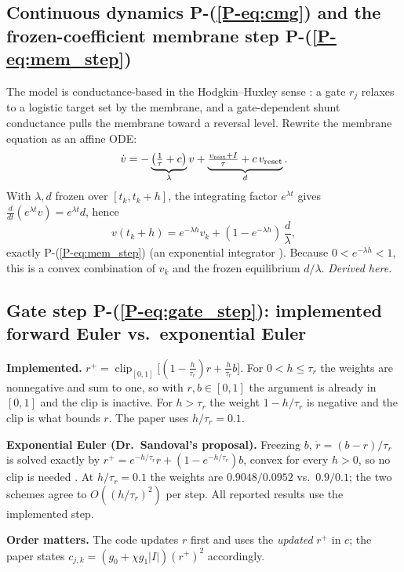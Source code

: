 \documentclass[11pt]{article}
\newcommand{\srcroot}{../../..}
\newcommand{\clip}{\operatorname{clip}}
\newcommand{\PE}[1]{P-(\ref{P-#1})}          %
\newcommand{\code}[1]{\texttt{\detokenize{#1}}}
\theoremstyle{remark}
\newcommand{\listing}[4]{%
  }
\begin{document}
\subsection{Continuous dynamics \PE{eq:cmg} and the frozen-coefficient membrane step \PE{eq:mem_step}}
The model is conductance-based in the Hodgkin--Huxley sense \cite{hodgkin1952quantitative}: a gate $r_j$
relaxes to a logistic target set by the membrane, and a gate-dependent shunt conductance pulls the membrane
toward a reversal level. Rewrite the membrane equation as an affine ODE:
\[
\dot v=-\underbrace{\big(\tfrac1\tau+c\big)}_{\lambda}v+\underbrace{\tfrac{v_{\rm rest}+I}{\tau}+c\,v_{\rm reset}}_{d}.
\]
With $\lambda,d$ frozen over $[t_k,t_k+h]$, the integrating factor $e^{\lambda t}$ gives
$\frac{d}{dt}(e^{\lambda t}v)=e^{\lambda t}d$, hence
\[
v(t_k+h)=e^{-\lambda h}v_k+(1-e^{-\lambda h})\,\frac d\lambda,
\]
exactly \PE{eq:mem_step} (an exponential integrator \cite{hochbruck2010exponential}). Because
$0<e^{-\lambda h}<1$, this is a convex combination of $v_k$ and the frozen equilibrium $d/\lambda$.
\emph{Derived here.}

\subsection{Gate step \PE{eq:gate_step}: implemented forward Euler vs.\ exponential Euler}
\textbf{Implemented.} $r^+=\clip_{[0,1]}\big[(1-\tfrac h{\tau_r})r+\tfrac h{\tau_r}b\big]$. For $0<h\le\tau_r$ the
weights are nonnegative and sum to one, so with $r,b\in[0,1]$ the argument is already in $[0,1]$ and the
clip is inactive. For $h>\tau_r$ the weight $1-h/\tau_r$ is negative and the clip is what bounds $r$.
The paper uses $h/\tau_r=0.1$.

\textbf{Exponential Euler (Dr.\ Sandoval's proposal).} Freezing $b$, $\dot r=(b-r)/\tau_r$ is solved exactly by
$r^+=e^{-h/\tau_r}r+(1-e^{-h/\tau_r})b$, convex for every $h>0$, so no clip is needed
\cite{hochbruck2010exponential}. At $h/\tau_r=0.1$ the weights are $0.9048/0.0952$ vs.\ $0.9/0.1$; the
two schemes agree to $O((h/\tau_r)^2)$ per step. All reported results use the implemented step.
\listing{src/gra_control/gate.py}{41}{55}{direct CMG bank: gate (Euler + clip), then membrane (exact frozen step)}
\listing{experiments/nengo_nef_replication_2026-08-29/nengo_cmg.py}{71}{89}{Nengo \code{NeuronType.step}: identical update, activity $\clip(G r)$}

\textbf{Order matters.} The code updates $r$ first and uses the \emph{updated} $r^+$ in $c$; the paper states
$c_{j,k}=(g_0+\chi g_1|I|)(r^+)^2$ accordingly.
\end{document}
